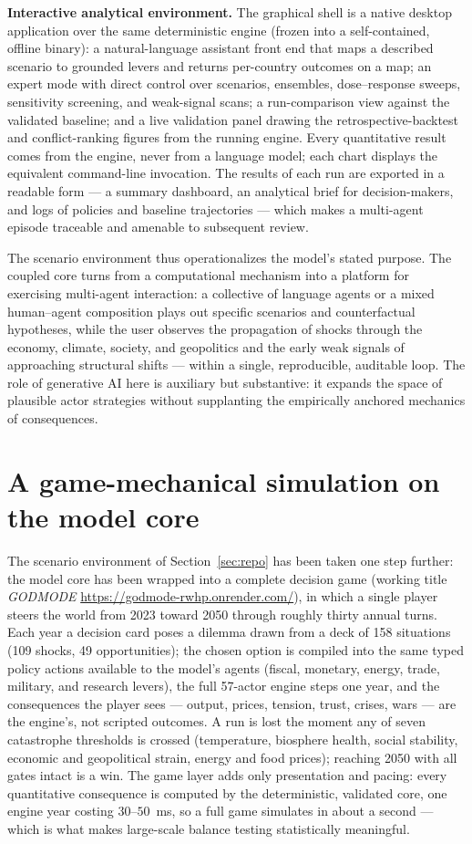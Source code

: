 \documentclass[a4paper,fleqn]{cas-sc}
\begin{document}
\textbf{Interactive analytical environment.} The graphical shell is a native desktop application
over the same deterministic engine (frozen into a self-contained, offline binary): a
natural-language assistant front end that maps a described scenario to grounded levers and returns
per-country outcomes on a map; an expert mode with direct control over scenarios, ensembles,
dose--response sweeps, sensitivity screening, and weak-signal scans; a run-comparison view against
the validated baseline; and a live validation panel drawing the retrospective-backtest and
conflict-ranking figures from the running engine. Every quantitative result comes from the engine,
never from a language model; each chart displays the equivalent command-line invocation. The
results of each run are exported in a readable form --- a summary dashboard, an analytical brief
for decision-makers, and logs of policies and baseline trajectories --- which makes a multi-agent
episode traceable and amenable to subsequent review.

The scenario environment thus operationalizes the model's stated purpose. The coupled core turns
from a computational mechanism into a platform for exercising multi-agent interaction: a collective
of language agents or a mixed human--agent composition plays out specific scenarios and
counterfactual hypotheses, while the user observes the propagation of shocks through the economy,
climate, society, and geopolitics and the early weak signals of approaching structural shifts ---
within a single, reproducible, auditable loop. The role of generative AI here is auxiliary but
substantive: it expands the space of plausible actor strategies without supplanting the empirically
anchored mechanics of consequences.


\section{A game-mechanical simulation on the model core}
\label{sec:game}

The scenario environment of Section~\ref{sec:repo} has been taken one step further: the model core
has been wrapped into a complete decision game (working title \emph{GODMODE} \url{https://godmode-rwhp.onrender.com/}), in which a single
player steers the world from 2023 toward 2050 through roughly thirty annual turns. Each year a
decision card poses a dilemma drawn from a deck of 158 situations (109 shocks, 49 opportunities);
the chosen option is compiled into the same typed policy actions available to the model's agents
(fiscal, monetary, energy, trade, military, and research levers), the full 57-actor engine steps
one year, and the consequences the player sees --- output, prices, tension, trust, crises, wars ---
are the engine's, not scripted outcomes. A run is lost the moment any of seven catastrophe
thresholds is crossed (temperature, biosphere health, social stability, economic and geopolitical
strain, energy and food prices); reaching 2050 with all gates intact is a win. The game layer adds
only presentation and pacing: every quantitative consequence is computed by the deterministic,
validated core, one engine year costing $30$--$50$~ms, so a full game simulates in about a second
--- which is what makes large-scale balance testing statistically meaningful.
\end{document}
